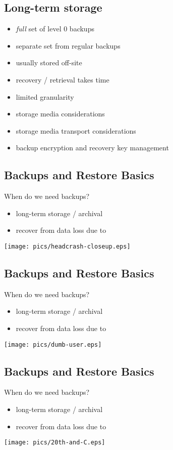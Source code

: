 \documentclass[xga]{xdvislides}
\begin{document}
\subsection{Long-term storage}
\begin{itemize}
	\item {\em full} set of level 0 backups
	\item separate set from regular backups
	\item usually stored off-site
	\item recovery / retrieval takes time
	\item limited granularity
	\item storage media considerations
	\item storage media transport considerations
	\item backup encryption and recovery key management
\end{itemize}


\subsection{Backups and Restore Basics}
When do we need backups?
\begin{itemize}
	\item long-term storage / archival
	\item recover from data loss due to
\end{itemize}
\vspace*{\fill}
\begin{center}
	\texttt{[image: pics/headcrash-closeup.eps]}
\end{center}
\vspace*{\fill}

\subsection{Backups and Restore Basics}
When do we need backups?
\begin{itemize}
	\item long-term storage / archival
	\item recover from data loss due to
\end{itemize}
\vspace*{\fill}
\begin{center}
	\texttt{[image: pics/dumb-user.eps]}
\end{center}
\vspace*{\fill}

\subsection{Backups and Restore Basics}
When do we need backups?
\begin{itemize}
	\item long-term storage / archival
	\item recover from data loss due to
\end{itemize}
\vspace*{\fill}
\begin{center}
	\texttt{[image: pics/20th-and-C.eps]}
\end{center}
\vspace*{\fill}
\end{document}
